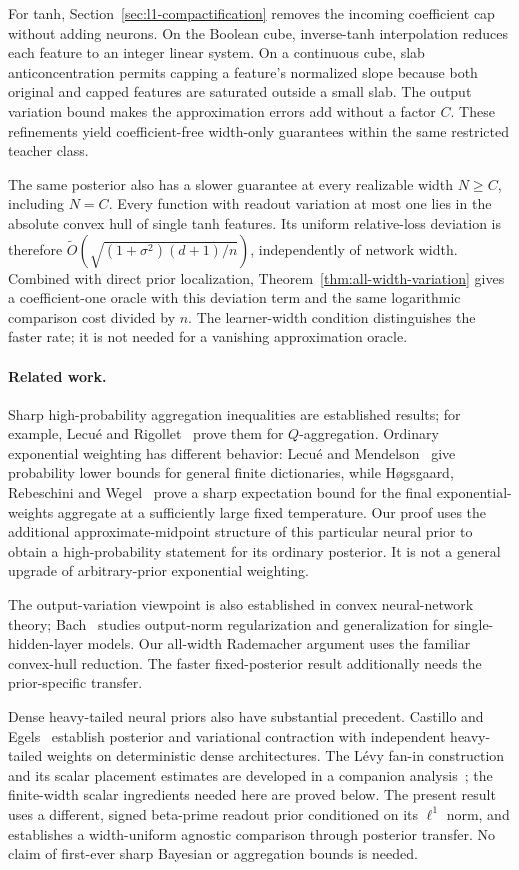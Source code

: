 \documentclass[11pt]{article}
\begin{document}
For tanh, Section~\ref{sec:l1-compactification} removes the incoming coefficient cap without adding neurons. On the Boolean cube, inverse-tanh interpolation reduces each feature to an integer linear system. On a continuous cube, slab anticoncentration permits capping a feature's normalized slope because both original and capped features are saturated outside a small slab. The output variation bound makes the approximation errors add without a factor $C$. These refinements yield coefficient-free width-only guarantees within the same restricted teacher class.

The same posterior also has a slower guarantee at every realizable width $N\ge C$, including $N=C$. Every function with readout variation at most one lies in the absolute convex hull of single tanh features. Its uniform relative-loss deviation is therefore $\widetilde O(\sqrt{(1+\sigma^2)(d+1)/n})$, independently of network width. Combined with direct prior localization, Theorem~\ref{thm:all-width-variation} gives a coefficient-one oracle with this deviation term and the same logarithmic comparison cost divided by $n$. The learner-width condition distinguishes the faster rate; it is not needed for a vanishing approximation oracle.

\paragraph{Related work.}
Sharp high-probability aggregation inequalities are established results; for example, Lecu\'e and Rigollet~\cite{qagg} prove them for $Q$-aggregation. Ordinary exponential weighting has different behavior: Lecu\'e and Mendelson~\cite{lm} give probability lower bounds for general finite dictionaries, while H\o gsgaard, Rebeschini and Wegel~\cite{hrw} prove a sharp expectation bound for the final exponential-weights aggregate at a sufficiently large fixed temperature. Our proof uses the additional approximate-midpoint structure of this particular neural prior to obtain a high-probability statement for its ordinary posterior. It is not a general upgrade of arbitrary-prior exponential weighting.

The output-variation viewpoint is also established in convex neural-network theory; Bach~\cite{bach} studies output-norm regularization and generalization for single-hidden-layer models. Our all-width Rademacher argument uses the familiar convex-hull reduction. The faster fixed-posterior result additionally needs the prior-specific transfer.

Dense heavy-tailed neural priors also have substantial precedent. Castillo and Egels~\cite{ce} establish posterior and variational contraction with independent heavy-tailed weights on deterministic dense architectures. The L\'evy fan-in construction and its scalar placement estimates are developed in a companion analysis~\cite{levy}; the finite-width scalar ingredients needed here are proved below. The present result uses a different, signed beta-prime readout prior conditioned on its $\ell^1$ norm, and establishes a width-uniform agnostic comparison through posterior transfer. No claim of first-ever sharp Bayesian or aggregation bounds is needed.
\end{document}
